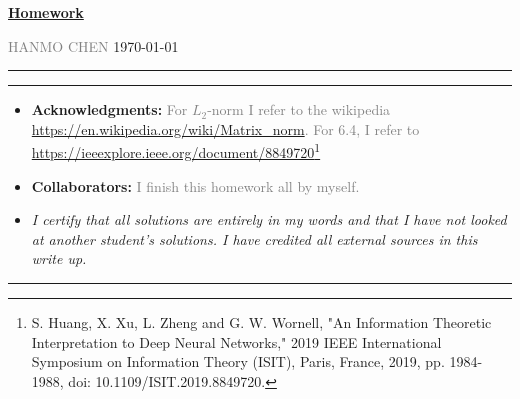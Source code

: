 \documentclass[a4paper]{article}
\begin{document}
\courseheader



\setcounter{hwcnt}{6} %

\begin{center}
  \underline{\bf Homework \thehwcnt} \\
\end{center}
\begin{flushleft}
  \textcolor{gray}{HANMO CHEN}\hfill
  \today
\end{flushleft}
\hrule

\vspace{2em}


\newcommand{\rvs}{\mathsf{s}} 
\newcommand{\rvr}{\mathsf{r}} 
\newcommand{\bB}{\mathbf{B}}  
\newcommand{\bg}{\boldsymbol{g}} 
\newcommand{\Bf}{\boldsymbol{f}} 

\flushleft
\rule{\textwidth}{1pt}
\begin{itemize}
\item {\bf Acknowledgments: \/} 
  \textcolor{gray}{For $L_2$-norm I refer to the wikipedia \url{https://en.wikipedia.org/wiki/Matrix_norm}. For 6.4, I refer to \url{https://ieeexplore.ieee.org/document/8849720}\footnote{ S. Huang, X. Xu, L. Zheng and G. W. Wornell, "An Information Theoretic Interpretation to Deep Neural Networks," 2019 IEEE International Symposium on Information Theory (ISIT), Paris, France, 2019, pp. 1984-1988, doi: 10.1109/ISIT.2019.8849720.}}

\item {\bf Collaborators: \/}
  \textcolor{gray}{I finish this homework all by myself.} 
\item  \emph{I certify that all solutions are entirely in my words and that I have not looked at another student's solutions. I have credited all external sources in this write up.}


  \framebox[\linewidth]{\rule{0pt}{10pt}\textcolor{gray}{\large Hanmo Chen}}
\end{itemize}
\rule{\textwidth}{1pt}
\end{document}
